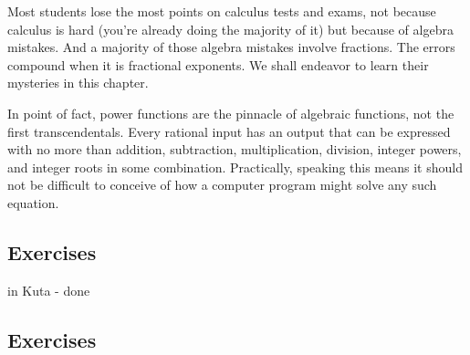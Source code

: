 

Most students lose the most points on calculus tests and exams, not because
calculus is hard (you're already doing the majority of it) but because of algebra mistakes.
And a majority of those algebra mistakes involve fractions.  The errors compound
when it is fractional exponents.  We shall endeavor to learn their mysteries in this chapter.

In point of fact, power functions are the pinnacle of algebraic functions, not the first
transcendentals.  Every rational input has an output that can be expressed with no 
more than addition, subtraction, multiplication, division, integer powers, and integer
roots in some combination.  Practically, speaking this means it should not be difficult
to conceive of how a computer program might solve any such equation.

\newpage
\chapterminitoc

\newpage
{}
\newpage

\newpage

\newpage



\newpage
{}
\newpage

\newpage
\subsection{Exercises}
in Kuta - done



\newpage
{}
\newpage

\newpage
\subsection{Exercises}
\noindent{}
\newpage
\noindent{}
\newpage
\noindent{}
\newpage
\noindent{}



\newpage
{}
\newpage

\newpage
